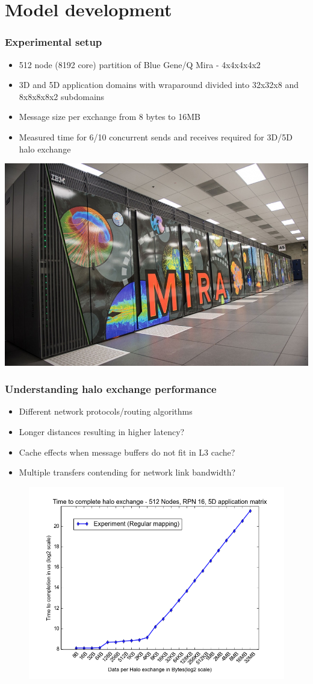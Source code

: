 \documentclass{beamer}
\begin{document}
\section{Model development}
\begin{frame}
\frametitle{Experimental setup}
\begin{itemize}
  \item 512 node (8192 core) partition of Blue Gene/Q Mira - 4x4x4x4x2
  \item 3D and 5D application domains with wraparound
        divided into 32x32x8 and 8x8x8x8x2 subdomains
  \item Message size per exchange from 8 bytes to 16MB
  \item Measured time for 6/10 concurrent sends and receives required
        for 3D/5D halo exchange
\end{itemize}

\centering
\includegraphics[width=0.45\linewidth]{mira}

\end{frame}

\begin{frame}
\frametitle{Understanding halo exchange performance}
\begin{itemize}
  \item Different network protocols/routing algorithms
  \item Longer distances resulting in higher latency?
  \item Cache effects when message buffers do not fit in L3 cache?
  \item Multiple transfers contending for network link bandwidth?
\end{itemize}
\vspace{-0.5em}
\begin{figure}
  \includegraphics[width=0.65\linewidth]{time_vs_data_regular.png}
\end{figure}
\end{frame}
\end{document}
